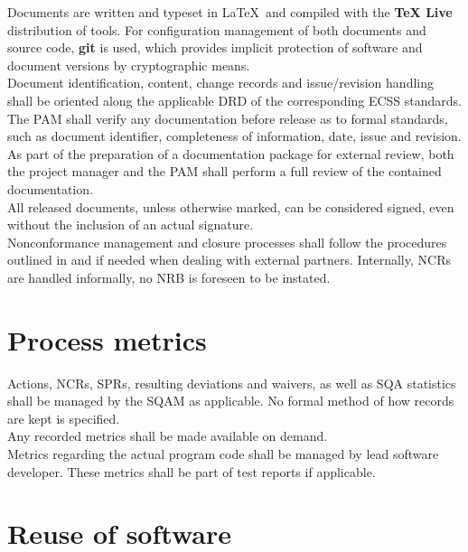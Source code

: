 Documents are written and typeset in \LaTeX\ and compiled with the \textbf{TeX Live}
distribution of tools. For configuration management of both documents and source
code, \textbf{git} is used, which provides implicit protection of software and
document versions by cryptographic means.\\

\noindent
Document identification, content, change records and issue/revision handling
shall be oriented along the applicable \gls{DRD} of the corresponding ECSS
standards.\\

\noindent
The \gls{PAM} shall verify any documentation before release as to formal
standards, such as document identifier, completeness of information, date,
issue and revision.\\

\noindent
As part of the preparation of a documentation package for external review, both
the project manager and the \gls{PAM} shall perform a full review of the
contained documentation.\\

\noindent
All released documents, unless otherwise marked, can be considered signed, even
without the inclusion of an actual signature.\\

\noindent
Nonconformance management and closure processes shall follow the procedures
outlined in \cite{ECSS80C} and \cite{ECSSQ1009C} if needed when dealing with
external partners. Internally, \glspl{NCR} are handled informally, no \gls{NRB}
is foreseen to be instated.


\section{Process metrics}

Actions, \glspl{NCR}, \glspl{SPR}, resulting deviations and waivers, as
well as \gls{SQA} statistics shall be managed by the \gls{SQAM} as applicable.
No formal method of how records are kept is specified.\\

\noindent
Any recorded metrics shall be made available on demand.\\

\noindent
Metrics regarding the actual program code shall be managed by lead software
developer. These metrics shall be part of test reports if applicable.


\section{Reuse of software}

